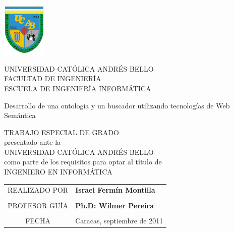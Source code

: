 \begin{center}
\parbox{4cm}{\includegraphics[width=0.16\textwidth]{images/escudoUcab.jpg}}\parbox{9cm}{\begin{center}
UNIVERSIDAD CATÓLICA ANDRÉS BELLO \\
FACULTAD DE INGENIERÍA \\
ESCUELA DE INGENIERÍA INFORMÁTICA \\
\end{center}}

\vspace{\fill}


\begin{LARGE}
Desarrollo de una ontología y un buscador utilizando tecnologías de Web Semántica
\end{LARGE}

\vspace{\fill}

TRABAJO ESPECIAL DE GRADO\\
presentado ante la\\
UNIVERSIDAD CATÓLICA ANDRÉS BELLO\\
como parte de los requisitos para optar al t\'itulo de\\
INGENIERO EN INFORM\'ATICA

\vspace{\fill}

{
\begin{tabular}{cl}
REALIZADO POR & \textbf{Israel Fermín Montilla}\tabularnewline
\multicolumn{2}{c}{}\tabularnewline
PROFESOR GUÍA & \textbf{Ph.D: Wilmer Pereira}\tabularnewline
\multicolumn{2}{c}{}\tabularnewline
FECHA & Caracas, septiembre de 2011\tabularnewline
\end{tabular}
}


\end{center}

